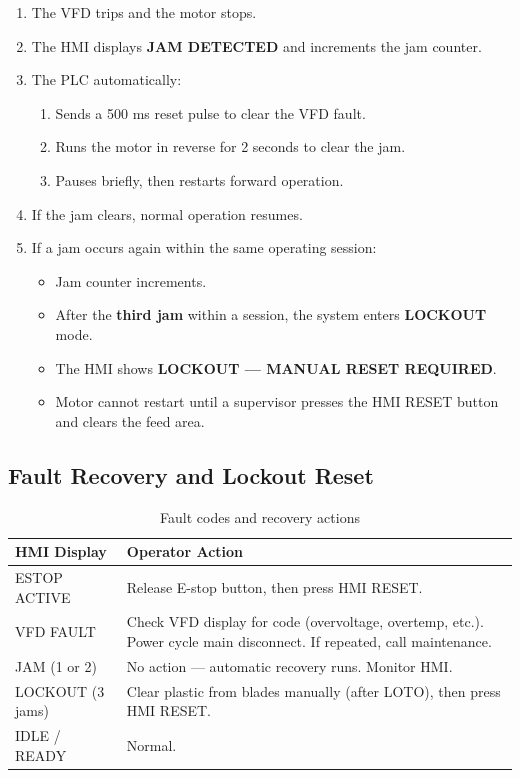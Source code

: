 \documentclass[hidelinks,12pt]{article}
\begin{document}
\begin{enumerate}
    \item The VFD trips and the motor stops.
    \item The HMI displays \textbf{JAM DETECTED} and increments the jam counter.
    \item The PLC automatically:
        \begin{enumerate}
            \item Sends a 500 ms reset pulse to clear the VFD fault.
            \item Runs the motor in reverse for 2 seconds to clear the jam.
            \item Pauses briefly, then restarts forward operation.
        \end{enumerate}
    \item If the jam clears, normal operation resumes.
    \item If a jam occurs again within the same operating session:
        \begin{itemize}
            \item Jam counter increments.
            \item After the \textbf{third jam} within a session, the system enters \textbf{LOCKOUT} mode.
            \item The HMI shows \textbf{LOCKOUT — MANUAL RESET REQUIRED}.
            \item Motor cannot restart until a supervisor presses the HMI RESET button and clears the feed area.
        \end{itemize}
\end{enumerate}

\subsection{Fault Recovery and Lockout Reset}
\label{subsec:faultrecovery}
\begin{table}[H]
\centering
\caption{Fault codes and recovery actions}
\label{tab:faultcodes}
\begin{tabularx}{0.9\textwidth}{|l|X|}
\hline
\rowcolor{PSUgreen!12}\textbf{HMI Display} & \textbf{Operator Action} \\
\hline
ESTOP ACTIVE & Release E-stop button, then press HMI RESET. \\
\hline
VFD FAULT & Check VFD display for code (overvoltage, overtemp, etc.). Power cycle main disconnect. If repeated, call maintenance. \\
\hline
JAM (1 or 2) & No action — automatic recovery runs. Monitor HMI. \\
\hline
LOCKOUT (3 jams) & Clear plastic from blades manually (after LOTO), then press HMI RESET. \\
\hline
IDLE / READY & Normal. \\
\hline
\end{tabularx}
\end{table}
\end{document}
